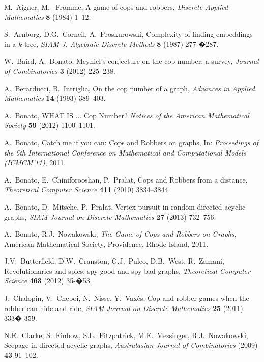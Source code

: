 \documentclass[12pt,reqno]{amsart}
\begin{document}
\begin{thebibliography}{99}


 M.~Aigner, M.~ Fromme, A game of cops and robbers, {\em Discrete Applied Mathematics} {\bf 8} (1984) 1--12.

 S.\ Arnborg, D.G.\ Corneil, A.\ Proskurowski, Complexity of finding embeddings in a $k$-tree, \emph{SIAM J. Algebraic Discrete Methods} \textbf{8} (1987) 277-�287.

 W.~Baird, A.~Bonato, Meyniel's conjecture on the cop number: a survey, \emph{Journal of Combinatorics} \textbf{3} (2012) 225--238.

 A.~Berarducci, B.~Intriglia, On the cop number of a graph, {\em Advances in Applied Mathematics} {\bf 14} (1993) 389--403.

 A.\ Bonato, WHAT IS ... Cop Number? \emph{Notices of the American Mathematical Society} \textbf{59} (2012) 1100--1101.

 A.\ Bonato,  Catch me if you can: Cops and Robbers on graphs, In: \emph{Proceedings of the 6th International Conference on Mathematical and Computational Models (ICMCM'11)}, 2011.

 A.\ Bonato, E.\ Chiniforooshan, P.\ Pra{\l }at, Cops and Robbers from a distance, \emph{Theoretical Computer Science} \textbf{411} (2010) 3834--3844.

 A.\ Bonato, D.\ Mitsche, P.\ Pra{\l }at, Vertex-pursuit in random directed acyclic graphs, \emph{SIAM Journal on Discrete Mathematics} \textbf{27} (2013) 732--756.

 A.\ Bonato, R.J.\ Nowakowski, \emph{The Game of Cops and Robbers on Graphs}, American Mathematical Society, Providence, Rhode Island, 2011.

 J.V.\ Butterfield, D.W.\ Cranston, G.J.\ Puleo, D.B.\ West, R.\ Zamani, Revolutionaries and spies: spy-good and spy-bad graphs, \emph{Theoretical Computer Science} \textbf{463} (2012) 35-�53.

 J.\ Chalopin, V.\ Chepoi, N.\ Nisse, Y.\ Vax\`{e}s, Cop and robber games when the robber can hide and ride, \emph{SIAM Journal on Discrete Mathematics} \textbf{25} (2011) 333�-359.

 N.E.\ Clarke, S.\ Finbow, S.L.\ Fitzpatrick, M.E.\ Messinger, R.J.\ Nowakowski, Seepage in directed acyclic graphs, \emph{Australasian Journal of Combinatorics} (2009) \textbf{43}
 91--102.


\end{thebibliography}
\end{document}
